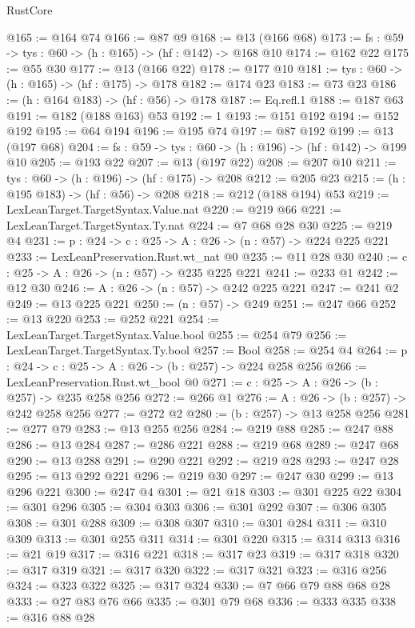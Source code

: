 \begin{lexlean}{RustCore}
\begin{coremodule}
@165 := @164 @74
@166 := @87 @9
@168 := @13 (@166 @68)
@173 := {fs : @59} -> {tys : @60} -> (h : @165) -> (hf : @142) -> @168 @10
@174 := @162 @22
@175 := @55 @30
@177 := @13 (@166 @22)
@178 := @177 @10
@181 := {tys : @60} -> (h : @165) -> (hf : @175) -> @178
@182 := @174 @23
@183 := @73 @23
@186 := (h : @164 @183) -> (hf : @56) -> @178
@187 := Eq.refl.{1}
@188 := @187 @63
@191 := @182 (@188 @163) @53
@192 := 1
@193 := @151 @192
@194 := @152 @192
@195 := @64 @194
@196 := @195 @74
@197 := @87 @192
@199 := @13 (@197 @68)
@204 := {fs : @59} -> {tys : @60} -> (h : @196) -> (hf : @142) -> @199 @10
@205 := @193 @22
@207 := @13 (@197 @22)
@208 := @207 @10
@211 := {tys : @60} -> (h : @196) -> (hf : @175) -> @208
@212 := @205 @23
@215 := (h : @195 @183) -> (hf : @56) -> @208
@218 := @212 (@188 @194) @53
@219 := LexLeanTarget.TargetSyntax.Value.nat
@220 := @219 @66
@221 := LexLeanTarget.TargetSyntax.Ty.nat
@224 := @7 @68 @28 @30
@225 := @219 @4
@231 := {p : @24} -> {c : @25} -> {A : @26} -> (n : @57) -> @224 @225 @221
@233 := LexLeanPreservation.Rust.wt_nat @0
@235 := @11 @28 @30
@240 := {c : @25} -> {A : @26} -> (n : @57) -> @235 @225 @221
@241 := @233 @1
@242 := @12 @30
@246 := {A : @26} -> (n : @57) -> @242 @225 @221
@247 := @241 @2
@249 := @13 @225 @221
@250 := (n : @57) -> @249
@251 := @247 @66
@252 := @13 @220
@253 := @252 @221
@254 := LexLeanTarget.TargetSyntax.Value.bool
@255 := @254 @79
@256 := LexLeanTarget.TargetSyntax.Ty.bool
@257 := Bool
@258 := @254 @4
@264 := {p : @24} -> {c : @25} -> {A : @26} -> (b : @257) -> @224 @258 @256
@266 := LexLeanPreservation.Rust.wt_bool @0
@271 := {c : @25} -> {A : @26} -> (b : @257) -> @235 @258 @256
@272 := @266 @1
@276 := {A : @26} -> (b : @257) -> @242 @258 @256
@277 := @272 @2
@280 := (b : @257) -> @13 @258 @256
@281 := @277 @79
@283 := @13 @255 @256
@284 := @219 @88
@285 := @247 @88
@286 := @13 @284
@287 := @286 @221
@288 := @219 @68
@289 := @247 @68
@290 := @13 @288
@291 := @290 @221
@292 := @219 @28
@293 := @247 @28
@295 := @13 @292 @221
@296 := @219 @30
@297 := @247 @30
@299 := @13 @296 @221
@300 := @247 @4
@301 := @21 @18
@303 := @301 @225 @22
@304 := @301 @296
@305 := @304 @303
@306 := @301 @292
@307 := @306 @305
@308 := @301 @288
@309 := @308 @307
@310 := @301 @284
@311 := @310 @309
@313 := @301 @255 @311
@314 := @301 @220
@315 := @314 @313
@316 := @21 @19
@317 := @316 @221
@318 := @317 @23
@319 := @317 @318
@320 := @317 @319
@321 := @317 @320
@322 := @317 @321
@323 := @316 @256
@324 := @323 @322
@325 := @317 @324
@330 := @7 @66 @79 @88 @68 @28
@333 := @27 @83 @76 @66
@335 := @301 @79 @68
@336 := @333 @335
@338 := @316 @88 @28

\end{coremodule}
\end{lexlean}
